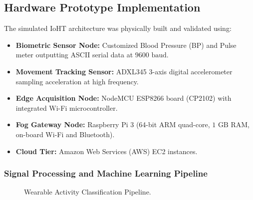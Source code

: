 \documentclass[11pt,a4paper,openany]{report}
\begin{document}
\subsection{Hardware Prototype Implementation}
The simulated IoHT architecture was physically built and validated using:
\begin{itemize}[leftmargin=*]
  \item \textbf{Biometric Sensor Node:} Customized Blood Pressure (BP) and Pulse meter outputting ASCII serial data at $9600\text{ baud}$.
  \item \textbf{Movement Tracking Sensor:} ADXL345 3-axis digital accelerometer sampling acceleration at high frequency.
  \item \textbf{Edge Acquisition Node:} NodeMCU ESP8266 board (CP2102) with integrated Wi-Fi microcontroller.
  \item \textbf{Fog Gateway Node:} Raspberry Pi 3 (64-bit ARM quad-core, $1\text{ GB}$ RAM, on-board Wi-Fi and Bluetooth).
  \item \textbf{Cloud Tier:} Amazon Web Services (AWS) EC2 instances.
\end{itemize}

\subsubsection{Signal Processing and Machine Learning Pipeline}
\begin{figure}[H]
\centering
{}
\caption{Wearable Activity Classification Pipeline.}
\end{figure}
\end{document}

